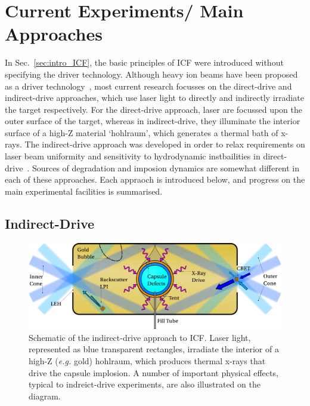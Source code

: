 \section{Current Experiments/ Main Approaches}%
\label{sec:intro_mainexperiments}

In Sec.~\ref{sec:intro_ICF}, the basic principles of \ac{ICF} were introduced without specifying the driver technology.
Although heavy ion beams have been proposed as a driver technology~\cite{metzler_target_1984}, most current research focusses on the direct-drive and indirect-drive approaches, which use laser light to directly and indirectly irradiate the target respectively.
For the direct-drive approach, laser are focussed upon the outer surface of the target, whereas in indirect-drive, they illuminate the interior surface of a high-Z material `hohlraum', which generates a thermal bath of x-rays.
The indirect-drive approach was developed in order to relax requirements on laser beam uniformity and sensitivity to hydrodynamic instbailities in direct-drive~\cite{lindl_development_1995}.
Sources of degradation and imposion dynamics are somewhat different in each of these approaches.
Each appraoch is introduced below, and progress on the main experimental facilities is summarised.

\subsection{Indirect-Drive}%
\label{sec:intro_indirect}

\begin{figure}[t!]
    \includegraphics[width=\linewidth]{Introduction/Images/indirect icf white.png}
    \centering
    \caption{Schematic of the indirect-drive approach to \ac{ICF}.
    Laser light, represented as blue transparent rectangles, irradiate the interior of a high-Z (\textit{e.g.} gold) hohlraum, which produces thermal x-rays that drive the capsule implosion.
    A number of important physical effects, typical to indreict-drive experiments, are also illustrated on the diagram.
    }%
    \label{fig:intro_indirect}
\end{figure}


